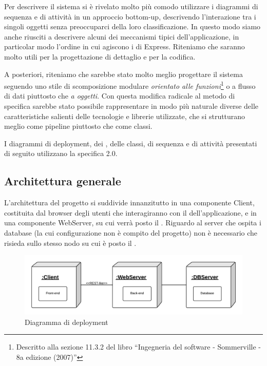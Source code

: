 Per descrivere il sistema si è rivelato molto più comodo utilizzare i diagrammi di sequenza e di attività in un approccio bottom-up, descrivendo l'interazione tra i singoli oggetti senza preoccuparci della loro classificazione. In questo modo siamo anche riusciti a descrivere alcuni dei meccanismi tipici dell'applicazione, in particolar modo l'ordine in cui agiscono i  di Express. Riteniamo che saranno molto utili per la progettazione di dettaglio e per la codifica.

A posteriori, riteniamo che sarebbe stato molto meglio progettare il sistema seguendo uno stile di scomposizione modulare \emph{orientato alle funzioni}\footnote{Descritto alla sezione 11.3.2 del libro ``Ingegneria del software - Sommerville - 8a edizione (2007)''} o a flusso di dati piuttosto che \emph{a oggetti}. Con questa modifica radicale al metodo di specifica sarebbe stato possibile rappresentare in modo più naturale diverse delle caratteristiche salienti delle tecnologie e librerie utilizzate, che si strutturano meglio come pipeline piuttosto che come classi.

I diagrammi di deployment, dei , delle classi, di sequenza e di attività presentati di seguito utilizzano la specifica  2.0.

\subsection{Architettura generale}

L'architettura del progetto si suddivide innanzitutto in una componente Client, costituita dal browser degli utenti che interagiranno con il  dell'applicazione, e in una componente WebServer, su cui verrà posto il . Riguardo al server che ospita i database (la cui configurazione non è compito del progetto) non è necessario che risieda sullo stesso nodo su cui è posto il .

\begin{figure}[H]
\centering
\includegraphics[width=\textwidth]{uml/diagramma-deployment.png}
\caption{Diagramma di deployment}
\end{figure}

